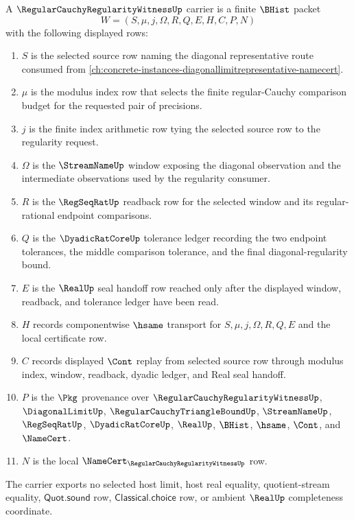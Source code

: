 \begin{definition}
\label{def:regular-cauchy-regularity-witness-carrier}
A $\RegularCauchyRegularityWitnessUp$ carrier is a finite $\BHist$ packet
$$
W=(S,\mu,j,\Omega,R,Q,E,H,C,P,N)
$$
with the following displayed rows:
\begin{enumerate}
\item $S$ is the selected source row naming the diagonal representative route consumed from \autoref{ch:concrete-instances-diagonallimitrepresentative-namecert}.
\item $\mu$ is the modulus index row that selects the finite regular-Cauchy comparison budget for the requested pair of precisions.
\item $j$ is the finite index arithmetic row tying the selected source row to the regularity request.
\item $\Omega$ is the $\StreamNameUp$ window exposing the diagonal observation and the intermediate observations used by the regularity consumer.
\item $R$ is the $\RegSeqRatUp$ readback row for the selected window and its regular-rational endpoint comparisons.
\item $Q$ is the $\DyadicRatCoreUp$ tolerance ledger recording the two endpoint tolerances, the middle comparison tolerance, and the final diagonal-regularity bound.
\item $E$ is the $\RealUp$ seal handoff row reached only after the displayed window, readback, and tolerance ledger have been read.
\item $H$ records componentwise $\hsame$ transport for $S,\mu,j,\Omega,R,Q,E$ and the local certificate row.
\item $C$ records displayed $\Cont$ replay from selected source row through modulus index, window, readback, dyadic ledger, and Real seal handoff.
\item $P$ is the $\Pkg$ provenance over $\RegularCauchyRegularityWitnessUp$, $\DiagonalLimitUp$, $\RegularCauchyTriangleBoundUp$, $\StreamNameUp$, $\RegSeqRatUp$, $\DyadicRatCoreUp$, $\RealUp$, $\BHist$, $\hsame$, $\Cont$, and $\NameCert$.
\item $N$ is the local $\NameCert_{\RegularCauchyRegularityWitnessUp}$ row.
\end{enumerate}
The carrier exports no selected host limit, host real equality, quotient-stream equality, $\mathsf{Quot.sound}$ row, $\mathsf{Classical.choice}$ row, or ambient $\RealUp$ completeness coordinate.
\end{definition}

